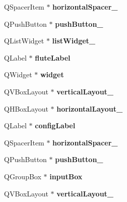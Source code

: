 \begin{DoxyCompactItemize}
Q\+Spacer\+Item $\ast$ {\bfseries horizontal\+Spacer\+\_}
\item 
\mbox{\label{classUi__Widget_a7115b8e7739f8b1de7cfa289af64f26c}} 
Q\+Push\+Button $\ast$ {\bfseries push\+Button\+\_}
\item 
\mbox{\label{classUi__Widget_a9f62524af42eba1f5f19b098d7e2f75a}} 
Q\+List\+Widget $\ast$ {\bfseries list\+Widget\+\_}
\item 
\mbox{\label{classUi__Widget_a9e8a6ddf5a4205b2043c1dbbdcb107cb}} 
Q\+Label $\ast$ {\bfseries flute\+Label}
\item 
\mbox{\label{classUi__Widget_a61443cab61d724a656b29c9bfbc8c530}} 
Q\+Widget $\ast$ {\bfseries widget}
\item 
\mbox{\label{classUi__Widget_afb49c3509cc27413f5c3aa934dbc5a34}} 
Q\+V\+Box\+Layout $\ast$ {\bfseries vertical\+Layout\+\_}
\item 
\mbox{\label{classUi__Widget_ad895fbb6ccaadbe47731c07424d9f0d9}} 
Q\+H\+Box\+Layout $\ast$ {\bfseries horizontal\+Layout\+\_}
\item 
\mbox{\label{classUi__Widget_a315dad27e152f973eee470e429df3d6a}} 
Q\+Label $\ast$ {\bfseries config\+Label}
\item 
\mbox{\label{classUi__Widget_a5ea4c6d825609c4286b16c10dbf2f7ea}} 
Q\+Spacer\+Item $\ast$ {\bfseries horizontal\+Spacer\+\_}
\item 
\mbox{\label{classUi__Widget_a9a91b227acb5c4fa379c71522031e344}} 
Q\+Push\+Button $\ast$ {\bfseries push\+Button\+\_}
\item 
\mbox{\label{classUi__Widget_a0ca2a8e588f4ac21cd1aeea991a7ee47}} 
Q\+Group\+Box $\ast$ {\bfseries input\+Box}
\item 
\mbox{\label{classUi__Widget_a94d824e35816b8321eabf0aa3ae12205}} 
Q\+V\+Box\+Layout $\ast$ {\bfseries vertical\+Layout\+\_}
\item 

\end{DoxyCompactItemize}
